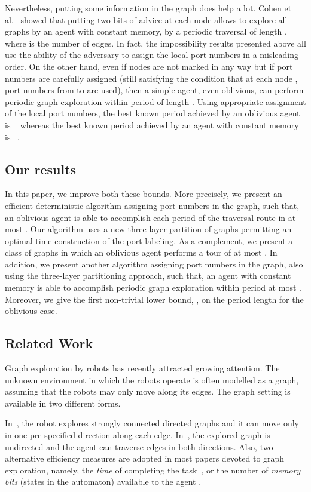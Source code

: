 \documentclass[11pt,envcountsame,oribibl]{llncs}
\begin{document}
Nevertheless, putting some information in the graph does help a
lot. Cohen et al.~\cite{CohFraIlcKorPel05} showed that putting two
bits of advice at each node allows to explore all graphs by an agent
with constant memory, by a periodic traversal of length , where  is the
number of edges. In fact, the impossibility results presented above
all use the ability of the adversary to assign the local port numbers
in a misleading order. On the other hand, even if nodes are not marked
in any way but if port numbers are carefully assigned (still
satisfying the condition that at each node , port numbers from 
to  are used), then a simple agent, even oblivious, can perform
periodic graph exploration within period of length . Using
appropriate assignment of the local port numbers, the best known
period achieved by an oblivious agent is ~\cite{DJSS05} whereas
the best known period achieved by an agent with constant memory is
~\cite{GKMNZ08}.


\subsection{Our results}

In this paper, we improve both
these bounds. More precisely, we present an efficient deterministic
algorithm assigning port numbers in the graph, such that, an oblivious
agent is able to accomplish each period of the traversal route in at
most .
Our algorithm uses a new three-layer partition of graphs permitting an
optimal time construction of the port labeling.
As a complement, we present a class of graphs in which an oblivious agent
performs a tour of at most .
In addition, we present another
algorithm assigning port numbers in the graph,
also using the three-layer partitioning approach,
such that, an agent with
constant memory is able to accomplish periodic graph exploration within period
at most .
Moreover, we give the first
non-trivial lower bound, , on the period length for the
oblivious case.


\subsection{Related Work}\label{Sec-Rel}
Graph exploration by robots has recently attracted growing
attention. The unknown environment in which the robots operate is
often modelled as a graph, assuming that the robots may only move
along its edges. The graph setting is available in two different
forms.

In~\cite{AlbHe00,BenFRSV98,BenSl94,DePa99,FT}, the robot explores
strongly connected directed graphs and it can move only in one
pre-specified direction along each edge.
In~\cite{AwBS99,BRS2,CohFraIlcKorPel05,DunKK01,FraIPPP04,FraIlcRajTix06,PanPe99}, the
explored graph is undirected and the agent can traverse edges in
both directions.
Also, two alternative efficiency measures are adopted in most papers
devoted to graph exploration, namely, the {\em time} of completing
the task~\cite{AlbHe00,AwBS99,BenFRSV98,BenSl94,BRS2,DePa99,DunKK01},
or the number of {\em
memory bits} (states in the automaton) available to the agent
\cite{CohFraIlcKorPel05,DiFKP02,FraIl04,FraIPPP04,FraIlcRajTix06,GPRZ07}.
\end{document}
